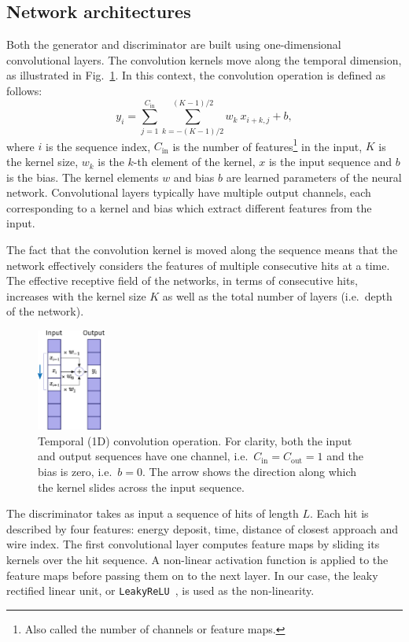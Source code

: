 \subsection{Network architectures}
Both the generator and discriminator are built using one-dimensional convolutional layers.
The convolution kernels move along the temporal dimension, as illustrated in Fig.~\ref{fig:temporal_conv}. 
In this context, the convolution operation is defined as follows:
\begin{equation}
    y_{i} = \sum_{j=1}^{C_\mathrm{in}} \sum_{k=-(K-1)/2}^{(K-1)/2} w_k\ x_{i+k,j} + b,
\end{equation}
where $i$ is the sequence index, $C_\mathrm{in}$ is the number of features\footnote{Also called the number of channels or feature maps.} in the input, $K$ is the kernel size, $w_k$ is the $k$-th element of the kernel, $x$ is the input sequence and $b$ is the bias. The kernel elements $w$ and bias $b$ are learned parameters of the neural network. 
Convolutional layers typically have multiple output channels, each corresponding to a kernel and bias which extract different features from the input.

The fact that the convolution kernel is moved along the sequence means that the network effectively considers the features of multiple consecutive hits at a time. The effective receptive field of the networks, in terms of consecutive hits, increases with the kernel size $K$ as well as the total number of layers (i.e.\ depth of the network).
\begin{figure}
    \centering
    \includegraphics[width=0.20\textwidth]{chapter4/1d_convolution.pdf}
    \caption{Temporal (1D) convolution operation. For clarity, both the input and output sequences have one channel, i.e.\  $C_\mathrm{in} = C_\mathrm{out} = 1$ and the bias is zero, i.e.\ $b = 0$. The arrow shows the direction along which the kernel slides across the input sequence.}
    \label{fig:temporal_conv}
\end{figure}

The discriminator takes as input a sequence of hits of length $L$. Each hit is described by four features: energy deposit, time, distance of closest approach and wire index. The first convolutional layer computes feature maps by sliding its kernels over the hit sequence. A non-linear activation function is applied to the feature maps before passing them on to the next layer. 
In our case, the leaky rectified linear unit, or \texttt{LeakyReLU}~\cite{Maas13rectifiernonlinearities}, is used as the non-linearity.

